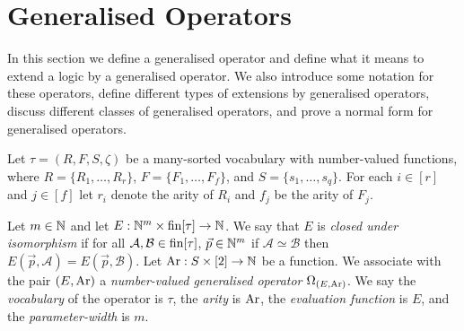 \documentclass[../main/thesis.tex]{subfiles}
\begin{document}

\section{Generalised Operators}
\label{chpt:gen-op--sec:generalised-operators}
In this section we define a generalised operator and define what it means to
extend a logic by a generalised operator. We also introduce some notation for
these operators, define different types of extensions by generalised operators,
discuss different classes of generalised operators, and prove a normal form for
generalised operators.

Let $\tau = (R, F, S, \zeta)$ be a many-sorted vocabulary with number-valued
functions, where $R = \{R_1, \ldots, R_{r}\}$, $F = \{ F_1, \ldots, F_{f} \}$,
and $S = \{s_1, \ldots, s_{q}\}$. For each $i \in [r]$ and $j \in [f]$ let $r_i$
denote the arity of $R_i$ and $f_j$ be the arity of $F_j$.

Let $m \in \mathbb{N}$ and let $E : \mathbb{N}^{m} \times \text{\upshape fin}{[\tau]} \rightarrow \mathbb{N}$. We say
that $E$ is \emph{closed under isomorphism} if for all $\mathcal{A}, \mathcal{B}
\in \text{\upshape fin}{[\tau]}$, $\vec{p} \in \mathbb{N}^{m}$ if $\mathcal{A} \simeq \mathcal{B}$
then $E(\vec{p}, \mathcal{A}) = E(\vec{p}, \mathcal{B})$. Let $\text{\upshape Ar} : S \times
[2] \rightarrow \mathbb{N}$ be a function. We associate with the pair $(E, \text{\upshape Ar})$ a
\emph{number-valued generalised operator} $\Omega_{(E, \text{\upshape Ar})}$. We say the
\emph{vocabulary} of the operator is $\tau$, the \emph{arity} is $\text{\upshape Ar}$, the
\emph{evaluation function} is $E$, and the \emph{parameter-width} is $m$.
\end{document}
